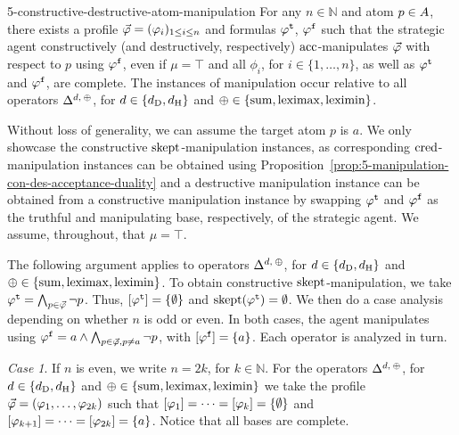 \begin{thm}{}{5-constructive-destructive-atom-manipulation}
	For any $n\in\mathbb{N}$
	and atom $p\in\Atoms$,
	there exists a profile 
	$\P=(\phi_i)_{1\le i \le n}$ and formulas $\truth{\phi}$, $\manip{\phi}$ 
	such that the strategic agent 
	constructively (and destructively, respectively) 
	$\acc$-manipulates $\P$ with respect to $p$ using $\manip{\phi}$,
	even if $\mu=\top$ and all $\phi_i$, for $i\in\{1,\dots,n\}$, 
	as well as $\truth{\phi}$ and $\manip{\phi}$, are complete.
	The instances of manipulation occur relative to all 
	operators $\me^{\dd,\:\agg}$, for 
	$\dd\in\{\dd_{\drastic},\dd_{\hamming}\}$
	and $\agg\in\set{\ssum,\leximax,\leximin}$.
\end{thm}
\begin{prf*}{}{}%
	Without loss of generality, we can assume the target atom $p$ is $a$.
	We only showcase the constructive $\skept$-manipulation instances, 
	as corresponding $\cred$-manipulation instances can be 
	obtained using Proposition~\ref{prop:5-manipulation-con-des-acceptance-duality}
	and a destructive manipulation instance can be obtained from a constructive manipulation instance
	by swapping $\truth{\phi}$ and $\manip{\phi}$ 
	as the truthful and manipulating base, respectively, of the strategic agent.
	We assume, throughout, that $\mu=\top$.
	
	The following argument applies to operators 
	$\me^{\dd,\:\agg}$, for $\dd\in\{\dd_{\drastic},\dd_{\hamming}\}$
	and $\agg\in\set{\ssum,\leximax,\leximin}$.
	To obtain constructive $\skept$-manipulation, 
	we take $\truth{\phi}=\bigwedge_{p\in\P}\lnot p$. 
	Thus, $[\truth{\phi}]=\{\emptyset\}$
	and $\skept(\truth{\phi})=\emptyset$. 
	We then do a case analysis depending on whether $n$ is odd or even.
	In both cases, the agent manipulates using
	$\manip{\phi}=a\land\bigwedge_{p\in\P,p\neq a}\lnot p$, with $[\manip{\phi}]=\{a\}$.
	Each operator is analyzed in turn.
	
	\emph{Case 1}.
	If $n$ is even, we write $n=2k$, for $k\in\mathbb{N}$.
	For the operators $\me^{\dd,\:\agg}$, 
	for $\dd\in\set{\dd_{\drastic},\dd_{\hamming}}$ and $\agg\in\set{\ssum,\leximax,\leximin}$ 
	we take the profile $\P=(\phi_1,\dots,\phi_{2k})$ 
	such that $\mods{\phi_1}=\dots=\mods{\phi_k}=\set{\emptyset}$ and 
	$\mods{\phi_{k+1}}=\dots=\mods{\phi_{2k}}=\set{a}$. 
	Notice that all bases are complete.
	

\end{prf*}
